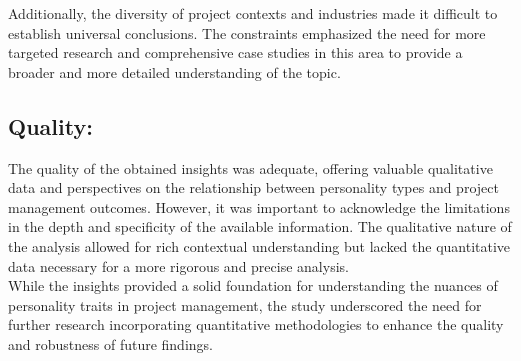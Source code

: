 \documentclass[a4Paper]{article}
\begin{document}
Additionally, the diversity of project contexts and industries made it difficult to establish universal conclusions. The constraints emphasized the need for more targeted research and comprehensive case studies in this area to provide a broader and more detailed understanding of the topic. \\

\subsection{Quality: }The quality of the obtained insights was adequate, offering valuable qualitative data and perspectives on the relationship between personality types and project management outcomes. However, it was important to acknowledge the limitations in the depth and specificity of the available information. The qualitative nature of the analysis allowed for rich contextual understanding but lacked the quantitative data necessary for a more rigorous and precise analysis.\\

While the insights provided a solid foundation for understanding the nuances of personality traits in project management, the study underscored the need for further research incorporating quantitative methodologies to enhance the quality and robustness of future findings.
\pagebreak

\pagebreak
\end{document}
